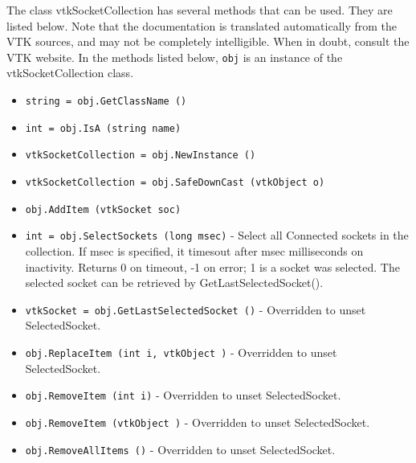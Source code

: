 The class vtkSocketCollection has several methods that can be used.
  They are listed below.
Note that the documentation is translated automatically from the VTK sources,
and may not be completely intelligible.  When in doubt, consult the VTK website.
In the methods listed below, \verb|obj| is an instance of the vtkSocketCollection class.
\begin{itemize}
\item  \verb|string = obj.GetClassName ()|

\item  \verb|int = obj.IsA (string name)|

\item  \verb|vtkSocketCollection = obj.NewInstance ()|

\item  \verb|vtkSocketCollection = obj.SafeDownCast (vtkObject o)|

\item  \verb|obj.AddItem (vtkSocket soc)|

\item  \verb|int = obj.SelectSockets (long msec)| -  Select all Connected sockets in the collection. If msec is specified,
 it timesout after msec milliseconds on inactivity. 
 Returns 0 on timeout, -1 on error; 1 is a socket was selected.
 The selected socket can be retrieved by GetLastSelectedSocket().

\item  \verb|vtkSocket = obj.GetLastSelectedSocket ()| -  Overridden to unset SelectedSocket.

\item  \verb|obj.ReplaceItem (int i, vtkObject )| -  Overridden to unset SelectedSocket.

\item  \verb|obj.RemoveItem (int i)| -  Overridden to unset SelectedSocket.

\item  \verb|obj.RemoveItem (vtkObject )| -  Overridden to unset SelectedSocket.

\item  \verb|obj.RemoveAllItems ()| -  Overridden to unset SelectedSocket.

\end{itemize}
